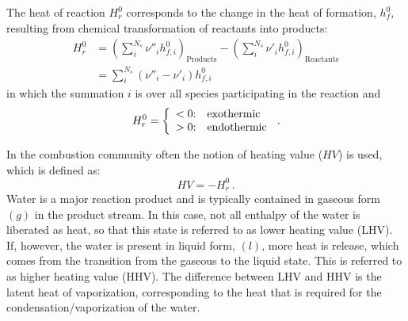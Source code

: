 The heat of reaction $ H^0_r$ corresponds to the change in the heat of formation, $h^0_f$, resulting from chemical transformation of reactants into products:
\begin{equation}
  \begin{split}
   H^0_r &= \left(\sum^{N_s}_i \nu''_i  {h}^0_{f,i}\right)_{\text{Products}} - \left(\sum^{N_s}_i \nu'_i  {h}^0_{f,i}\right)_{\text{Reactants}}\\
                &=\sum^{N_s}_{i}(\nu''_i - \nu'_i) {h}^0_{f,i}
  \end{split}
\end{equation}
in which the summation $i$ is over all species participating in the reaction and
\begin{equation}
    H^0_r = \left\{
     \begin{array}{r@{:\quad}l}
          <0 & {\text{exothermic}}\\
          >0 & {\text{endothermic}}\\
      \end{array}
    \right. \, \text{.}
\end{equation}

In the combustion community often the notion of heating value ($HV$) is used, which 
is defined as: 
\begin{equation} 
 HV = - H^0_r \, \text{.}
\end{equation}
Water is a major reaction product and is typically contained in gaseous form ${(g)}$ in the product stream. In this case, not all enthalpy of the water is liberated as heat, so that this state is referred to as lower heating value (LHV). If, however, the water is present in liquid form, ${(l)}$, more heat is release, which comes from the transition from the gaseous to the liquid state. This is referred to as higher heating value (HHV). The difference between LHV and HHV is the latent heat of vaporization, corresponding to the heat that is required for the condensation/vaporization of the water.


